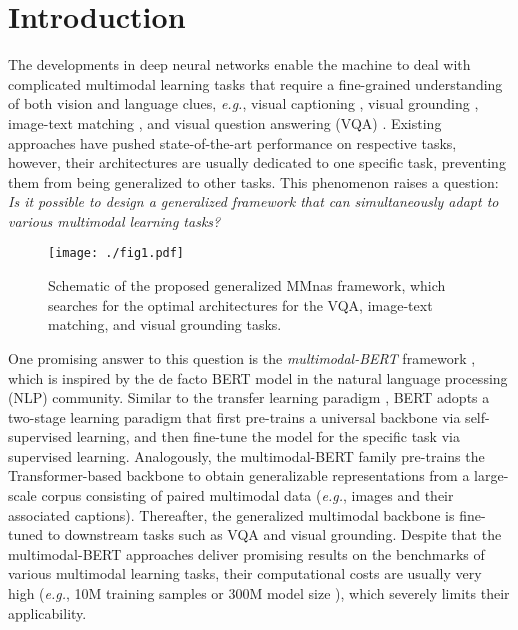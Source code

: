 \documentclass[sigconf]{acmart}
\begin{document}



\maketitle

\section{Introduction}
The developments in deep neural networks enable the machine to deal with complicated multimodal learning tasks that require a fine-grained understanding of both vision and language clues, \emph{e.g.}, visual captioning \cite{xu2015show, anderson2017up-down}, visual grounding \cite{rohrbach2016grounding, yu2018mattnet}, image-text matching \cite{kim2018bilinear, nam2017dual}, and visual question answering (VQA) \cite{fukui2016multimodal, yu2017mfb}. Existing approaches have pushed state-of-the-art performance on respective tasks, however, their architectures are usually dedicated to one specific task, preventing them from being generalized to other tasks. This phenomenon raises a question: \emph{Is it possible to design a generalized framework that can simultaneously adapt to various multimodal learning tasks?}

\begin{figure}
\begin{center}
\texttt{[image: ./fig1.pdf]}
\caption{Schematic of the proposed generalized MMnas framework, which searches for the optimal architectures for the VQA,  image-text matching, and visual grounding tasks.}
\label{fig:example}
\end{center}
\end{figure}

One promising answer to this question is the \emph{multimodal-BERT} framework \cite{tan2019lxmert, chen2019uniter, lu2019vilbert, li2019visualbert}, which is inspired by the de facto BERT model \cite{devlin2019bert} in the natural language processing (NLP) community. Similar to the transfer learning paradigm \cite{zamir2018taskonomy, tang2016generalized}, BERT adopts a two-stage learning paradigm that first pre-trains a universal backbone via self-supervised learning, and then fine-tune the model for the specific task via supervised learning. Analogously, the multimodal-BERT family pre-trains the Transformer-based backbone to obtain generalizable representations from a large-scale corpus consisting of paired multimodal data (\emph{e.g.}, images and their associated captions). Thereafter, the generalized multimodal backbone is fine-tuned to downstream tasks such as VQA and visual grounding. Despite that the multimodal-BERT approaches deliver promising results on the benchmarks of various multimodal learning tasks, their computational costs are usually very high (\emph{e.g.}, 10M training samples \cite{tan2019lxmert} or 300M model size \cite{lu2019vilbert, chen2019uniter}), which severely limits their applicability.
\end{document}
